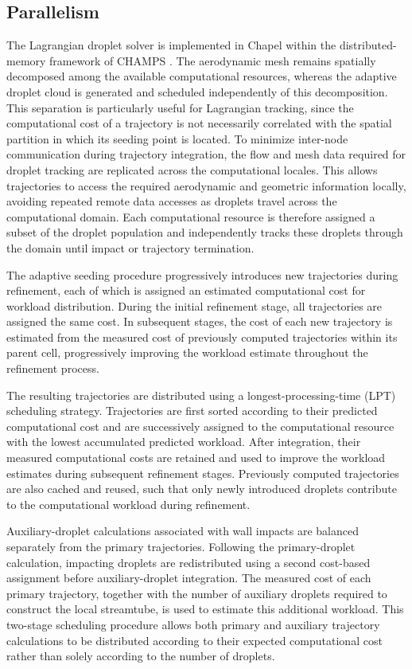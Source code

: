 \subsection{Parallelism}

The Lagrangian droplet solver is implemented in Chapel within the distributed-memory framework of \textsc{CHAMPS} \cite{parenteau}. The aerodynamic mesh remains spatially decomposed among the available computational resources, whereas the adaptive droplet cloud is generated and scheduled independently of this decomposition. This separation is particularly useful for Lagrangian tracking, since the computational cost of a trajectory is not necessarily correlated with the spatial partition in which its seeding point is located. To minimize inter-node communication during trajectory integration, the flow and mesh data required for droplet tracking are replicated across the computational locales. This allows trajectories to access the required aerodynamic and geometric information locally, avoiding repeated remote data accesses as droplets travel across the computational domain. Each computational resource is therefore assigned a subset of the droplet population and independently tracks these droplets through the domain until impact or trajectory termination.

The adaptive seeding procedure progressively introduces new trajectories during refinement, each of which is assigned an estimated computational cost for workload distribution. During the initial refinement stage, all trajectories are assigned the same cost. In subsequent stages, the cost of each new trajectory is estimated from the measured cost of previously computed trajectories within its parent cell, progressively improving the workload estimate throughout the refinement process.

The resulting trajectories are distributed using a longest-processing-time (LPT) scheduling strategy. Trajectories are first sorted according to their predicted computational cost and are successively assigned to the computational resource with the lowest accumulated predicted workload. After integration, their measured computational costs are retained and used to improve the workload estimates during subsequent refinement stages. Previously computed trajectories are also cached and reused, such that only newly introduced droplets contribute to the computational workload during refinement.

Auxiliary-droplet calculations associated with wall impacts are balanced separately from the primary trajectories. Following the primary-droplet calculation, impacting droplets are redistributed using a second cost-based assignment before auxiliary-droplet integration. The measured cost of each primary trajectory, together with the number of auxiliary droplets required to construct the local streamtube, is used to estimate this additional workload. This two-stage scheduling procedure allows both primary and auxiliary trajectory calculations to be distributed according to their expected computational cost rather than solely according to the number of droplets.

